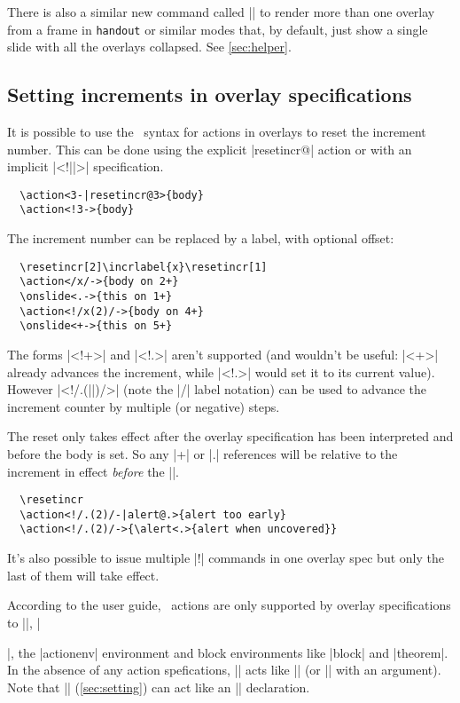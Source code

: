 \documentclass[a4paper]{ltxdoc}
\begin{document}
There is also a similar new command called |\handoutframe| to render more than
one overlay from a frame in \texttt{handout} or similar modes that, by default,
just show a single slide with all the overlays collapsed.  See \cref{sec:helper}.

\subsection{Setting increments in overlay specifications}

It is possible to use the \beamer\ syntax for actions in overlays to reset the
increment number.  This can be done using the explicit |resetincr@| action or
with an implicit |<!||>| specification.  \example
\begin{verbatim}
  \action<3-|resetincr@3>{body}
  \action<!3->{body}
\end{verbatim}
The increment number can be replaced by a label, with optional offset:
\begin{verbatim}
  \resetincr[2]\incrlabel{x}\resetincr[1]
  \action</x/->{body on 2+}
  \onslide<.->{this on 1+}
  \action<!/x(2)/->{body on 4+}
  \onslide<+->{this on 5+}
\end{verbatim}
The forms |<!+>| and |<!.>| aren't supported (and wouldn't be useful: |<+>|
already advances the increment, while |<!.>| would set it to its current value).
However |<!/.(||)/>| (note the |/| label notation) can be used to advance the
increment counter by multiple (or negative) steps.

The reset only takes effect after the overlay specification has been interpreted
and before the body is set.  So any |+| or |.| references will be relative to
the increment in effect \emph{before} the |\action|.
\example
\begin{verbatim}
  \resetincr
  \action<!/.(2)/-|alert@.>{alert too early}
  \action<!/.(2)/->{\alert<.>{alert when uncovered}}
\end{verbatim}
It's also possible to
issue multiple |!| commands in one overlay spec but only the last of them will
take effect.

According to the user guide, \beamer\ actions are only supported by overlay
specifications to |\action|, |\item|, the |actionenv| environment and block
environments like |block| and |theorem|.  In the absence of any action
spefications, |\action| acts like |\uncover| (or |\onslide| with an argument).
Note that |\fromslide| (\cref{sec:setting}) can act like an |\onslide|
declaration.
\end{document}

